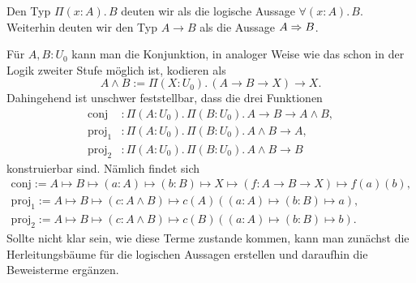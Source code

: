 Den Typ $\Pi(x\colon A).\, B$ deuten wir als die logische Aussage
$\forall (x\colon A).\, B$. Weiterhin deuten wir den Typ $A\to B$ als die
Aussage $A\Rightarrow B$.

Für $A,B\colon U_0$ kann man die Konjunktion, in analoger Weise wie das
schon in der Logik zweiter Stufe möglich ist, kodieren als
\[A\land B := \Pi(X\colon U_0).\, (A\to B\to X)\to X.\]
Dahingehend ist unschwer feststellbar, dass die drei Funktionen
\begin{align*}
\mathrm{conj}&\colon \Pi(A\colon U_0).\,\Pi(B\colon U_0).\,A\to B\to A\land B,\\
\mathrm{proj}_1&\colon \Pi(A\colon U_0).\,\Pi(B\colon U_0).\, A\land B\to A,\\
\mathrm{proj}_2&\colon \Pi(A\colon U_0).\,\Pi(B\colon U_0).\, A\land B\to B
\end{align*}
konstruierbar sind. Nämlich findet sich
\begin{gather*}
\mathrm{conj} := A\mapsto B\mapsto (a\colon A)\mapsto (b\colon B)\mapsto X\mapsto (f\colon A\to B\to X)\mapsto f(a)(b),\\
\mathrm{proj}_1 := A\mapsto B\mapsto (c\colon A\land B)\mapsto c(A)((a\colon A)\mapsto (b\colon B)\mapsto a),\\
\mathrm{proj}_2 := A\mapsto B\mapsto (c\colon A\land B)\mapsto c(B)((a\colon A)\mapsto (b\colon B)\mapsto b).
\end{gather*}
Sollte nicht klar sein, wie diese Terme zustande kommen, kann man zunächst
die Herleitungsbäume für die logischen Aussagen erstellen und daraufhin
die Beweisterme ergänzen.
